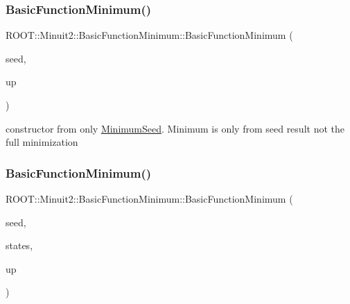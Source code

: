 \mbox{\label{classROOT_1_1Minuit2_1_1BasicFunctionMinimum_a7482d18115a4dc6cd3a0690074c7bbb7}} 
\subsubsection{\texorpdfstring{BasicFunctionMinimum()}{BasicFunctionMinimum()}\hspace{0.1cm}{\footnotesize\ttfamily [6/10]}}
{\footnotesize\ttfamily R\+O\+O\+T\+::\+Minuit2\+::\+Basic\+Function\+Minimum\+::\+Basic\+Function\+Minimum (\begin{DoxyParamCaption}\item[{const \mbox{\hyperlink{classROOT_1_1Minuit2_1_1MinimumSeed}{Minimum\+Seed}} \&}]{seed,  }\item[{double}]{up }\end{DoxyParamCaption})\hspace{0.3cm}{\ttfamily [inline]}}



constructor from only \mbox{\hyperlink{classROOT_1_1Minuit2_1_1MinimumSeed}{Minimum\+Seed}}. Minimum is only from seed result not the full minimization 

\mbox{\label{classROOT_1_1Minuit2_1_1BasicFunctionMinimum_a8a2f91243b896e3fe682c19ccd57a9bc}} 
\subsubsection{\texorpdfstring{BasicFunctionMinimum()}{BasicFunctionMinimum()}\hspace{0.1cm}{\footnotesize\ttfamily [7/10]}}
{\footnotesize\ttfamily R\+O\+O\+T\+::\+Minuit2\+::\+Basic\+Function\+Minimum\+::\+Basic\+Function\+Minimum (\begin{DoxyParamCaption}\item[{const \mbox{\hyperlink{classROOT_1_1Minuit2_1_1MinimumSeed}{Minimum\+Seed}} \&}]{seed,  }\item[{const std\+::vector$<$ \mbox{\hyperlink{classROOT_1_1Minuit2_1_1MinimumState}{Minimum\+State}} $>$ \&}]{states,  }\item[{double}]{up }\end{DoxyParamCaption})\hspace{0.3cm}{\ttfamily [inline]}}



